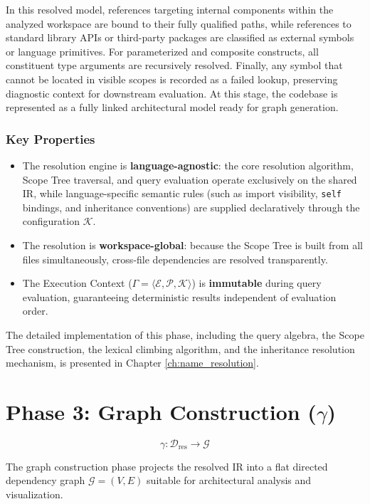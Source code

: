 In this resolved model, references targeting internal components within the
analyzed workspace are bound to their fully qualified paths, while
references to standard library APIs or third-party packages are classified as
external symbols or language primitives. For parameterized and composite
constructs, all constituent type arguments are recursively resolved. Finally,
any symbol that cannot be located in visible scopes is recorded as a failed
lookup, preserving diagnostic context for downstream evaluation. At this stage,
the codebase is represented as a fully linked architectural model ready for
graph generation.

\subsubsection{Key Properties}
\begin{itemize}
  \item The resolution engine is \textbf{language-agnostic}: the core
    resolution algorithm, Scope Tree traversal, and query evaluation
    operate exclusively on the shared IR, while language-specific semantic
    rules (such as import visibility, \texttt{self} bindings, and
    inheritance conventions) are supplied declaratively through the
    configuration $\mathcal{K}$.
  \item The resolution is \textbf{workspace-global}: because the
    Scope Tree is built from all files simultaneously, cross-file
    dependencies are resolved transparently.
  \item The Execution Context ($\Gamma = \langle \mathcal{E},
    \mathcal{P}, \mathcal{K} \rangle$) is \textbf{immutable}
    during query evaluation, guaranteeing deterministic results
    independent of evaluation order.
\end{itemize}

The detailed implementation of this phase, including the query
algebra, the Scope Tree construction, the lexical climbing algorithm,
and the inheritance resolution mechanism, is presented in Chapter
\ref{ch:name_resolution}.

\section{Phase 3: Graph Construction ($\gamma$)}
\label{sec:phase3_overview}

$$\gamma : \mathcal{D}_{\text{res}} \to \mathcal{G}$$

The graph construction phase projects the resolved IR into a flat
directed dependency graph $\mathcal{G} = (V, E)$ suitable for
architectural analysis and visualization.

